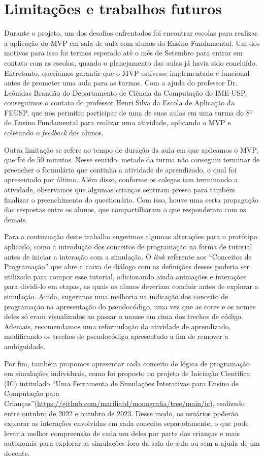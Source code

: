 \section{Limitações e trabalhos futuros}

Durante o projeto, um dos desafios enfrentados foi encontrar escolas para realizar a aplicação do MVP em sala de aula com alunos do Ensino Fundamental. Um dos motivos para isso foi termos esperado até o mês de Setembro para entrar em contato com as escolas, quando o planejamento das aulas já havia sido concluído. Entretanto, queríamos garantir que o MVP estivesse implementado e funcional antes de prometer uma aula para as turmas. Com a ajuda do professor Dr. Leônidas Brandão do Departamento de Ciência da Computação do IME-USP, conseguimos o contato do professor Henri Silva da Escola de Aplicação da FEUSP, que nos permitiu participar de uma de suas aulas em uma turma do 8º do Ensino Fundamental para realizar uma atividade, aplicando o MVP e coletando o \textit{feedback} dos alunos.

Outra limitação se refere ao tempo de duração da aula em que aplicamos o MVP, que foi de 50 minutos. Nesse sentido, metade da turma não conseguiu terminar de preencher o formulário que continha a atividade de aprendizado, o qual foi apresentado por último. Além disso, conforme os colegas iam terminando a atividade, observamos que algumas crianças sentiram pressa para também finalizar o preenchimento do questionário. Com isso, houve uma certa propagação das respostas entre os alunos, que compartilharam o que responderam com os demais.

Para a continuação deste trabalho sugerimos algumas alterações para o protótipo aplicado, como a introdução dos conceitos de programação na forma de tutorial antes de iniciar a interação com a simulação. O \textit{link} referente aos \enquote{Conceitos de Programação} que abre a caixa de diálogo com as definições desses poderia ser utilizado para compor esse tutorial, adicionando ainda animações e interações para dividi-lo em etapas, as quais os alunos deveriam concluir antes de explorar a simulação. Ainda, sugerimos uma melhoria na indicação dos conceito de programação na apresentação do pseudocódigo, uma vez que as cores e os nomes deles só eram visualizados ao passar o mouse em cima dos trechos de código. Ademais, recomendamos uma reformulação da atividade de aprendizado, modificando os trechos de pseudocódigo apresentado a fim de remover a ambiguidade.

Por fim, também propomos apresentar cada conceito de lógica de programação em simulações individuais, como foi proposto no projeto de Iniciação Científica (IC) intitulado ``Uma Ferramenta de Simulações Interativas para Ensino de Computação para Crianças''(\url{https://github.com/mariliatd/monografia/tree/main/ic}), realizado entre outubro de 2022 e outubro de 2023. Desse modo, os usuários poderão explorar as interações envolvidas em cada conceito separadamente, o que pode levar a melhor compreensão de cada um deles por parte das crianças e mais autonomia para explorar as simulações fora da sala de aula ou sem a ajuda de um docente.